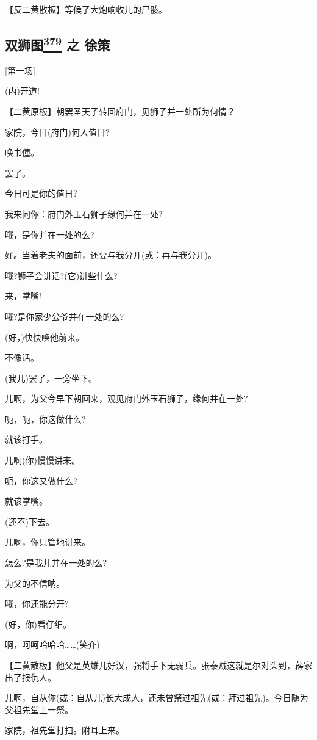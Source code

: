 【反二黄散板】等候了大炮响收儿的尸骸。

\newpage
\hypertarget{ux53ccux72eeux56fe-ux4e4b-ux5f90ux7b56}{%
\subsection{\texorpdfstring{双狮图\protect\hyperlink{fn379}{\textsuperscript{379}}
之
徐策}{双狮图379 之 徐策}}\label{ux53ccux72eeux56fe-ux4e4b-ux5f90ux7b56}}

{[}第一场{]}

(内)开道!

【二黄原板】朝罢圣天子转回府门，见狮子并一处所为何情？

家院，今日(府门)何人值日?

唤书僮。

罢了。

今日可是你的值日?

我来问你：府门外玉石狮子缘何并在一处?

哦，是你并在一处的么?

好。当着老夫的面前，还要与我分开(或：再与我分开)。

哦?狮子会讲话?(它)讲些什么?

来，掌嘴!

哦?是你家少公爷并在一处的么?

(好，)快快唤他前来。

不像话。

(我儿)罢了，一旁坐下。

儿啊，为父今早下朝回来，观见府门外玉石狮子，缘何并在一处?

呃，呃，你这做什么?

就该打手。

儿啊(你)慢慢讲来。

呃，你这又做什么?

就该掌嘴。

(还不)下去。

儿啊，你只管地讲来。

怎么?是我儿并在一处的么?

为父的不信呐。

哦，你还能分开?

(好，你)看仔细。

啊，呵呵哈哈哈\ldots{}\ldots{}(笑介)

【二黄散板】他父是英雄儿好汉，强将手下无弱兵。张泰贼这就是尔对头到，薜家出了报仇人。

儿啊，自从你(或：自从儿)长大成人，还未曾祭过祖先(或：拜过祖先)。今日随为父祖先堂上一祭。

家院，祖先堂打扫。附耳上来。

